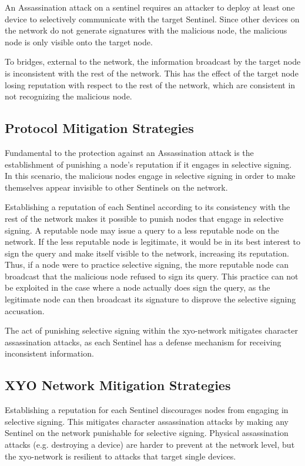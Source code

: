 \documentclass{article}
\begin{document}
An Assassination attack on a \Gls{sentinel} requires an attacker to deploy at least one device to selectively communicate with the target Sentinel. Since other devices on the network do not generate signatures with the malicious node, the malicious node is only visible onto the target node.

To \gls{bridge}s, external to the network, the information broadcast by the target node is inconsistent with the rest of the network. This has the effect of the target node losing reputation with respect to the rest of the network, which are consistent in not recognizing the malicious node.

\subsection{Protocol Mitigation Strategies}

Fundamental to the protection against an Assassination attack is the establishment of punishing a node's reputation if it engages in selective signing. In this scenario, the malicious nodes engage in selective signing in order to make themselves appear invisible to other Sentinels on the network.

Establishing a reputation of each Sentinel according to its consistency with the rest of the network makes it possible to punish nodes that engage in selective signing. A reputable node may issue a query to a less reputable node on the network. If the less reputable node is legitimate, it would be in its best interest to sign the query and make itself visible to the network, increasing its reputation. Thus, if a node were to practice selective signing, the more reputable node can broadcast that the malicious node refused to sign its query. This practice can not be exploited in the case where a node actually does sign the query, as the legitimate node can then broadcast its signature to disprove the selective signing accusation.

The act of punishing selective signing within the \Gls{xyo-network} mitigates character assassination attacks, as each Sentinel has a defense mechanism for receiving inconsistent information.

\subsection{XYO Network Mitigation Strategies}

Establishing a reputation for each Sentinel discourages nodes from engaging in selective signing. This mitigates character assassination attacks by making any Sentinel on the network punishable for selective signing. Physical assassination attacks (e.g. destroying a device) are harder to prevent at the network level, but the \Gls{xyo-network} is resilient to attacks that target single devices.
\end{document}
